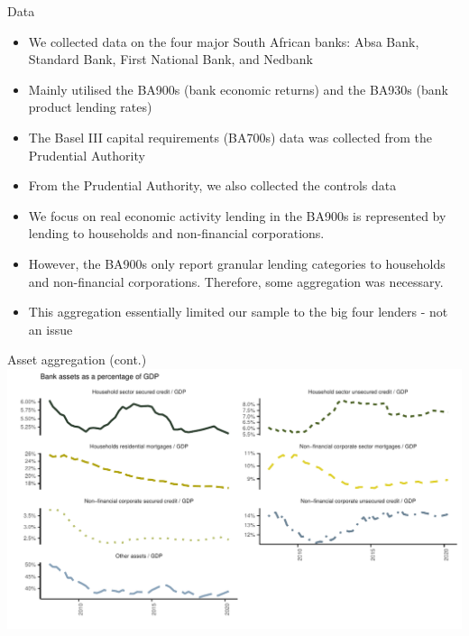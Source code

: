 \documentclass[
  14,
  ignorenonframetext,
  aspectratio=141,
]{beamer}
\providecommand{\tightlist}{%
  \setlength{\itemsep}{0pt}\setlength{\parskip}{0pt}}
\begin{document}
\begin{frame}{Data}
\protect\hypertarget{data}{}
\begin{itemize}
\tightlist
\item
  We collected data on the four major South African banks: Absa Bank,
  Standard Bank, First National Bank, and Nedbank
\item
  Mainly utilised the BA900s (bank economic returns) and the BA930s
  (bank product lending rates)
\item
  The Basel III capital requirements (BA700s) data was collected from
  the Prudential Authority
\item
  From the Prudential Authority, we also collected the controls data
\item
  We focus on real economic activity lending in the BA900s is
  represented by lending to households and non-financial corporations.
\item
  However, the BA900s only report granular lending categories to
  households and non-financial corporations. Therefore, some aggregation
  was necessary.
\item
  This aggregation essentially limited our sample to the big four
  lenders - not an issue
\end{itemize}
\end{frame}

\begin{frame}{Asset aggregation (cont.)}
\protect\hypertarget{asset-aggregation-cont.}{}
\includegraphics{baseIII_and_bank_lending_files/figure-beamer/assets-1.pdf}
\end{frame}
\end{document}
